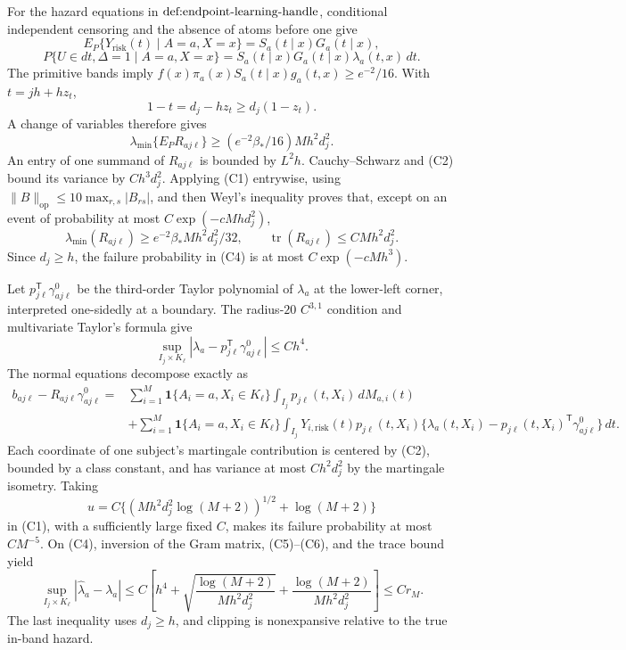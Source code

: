For the hazard equations in \(\textnormal{def:endpoint-learning-handle}\), conditional independent censoring and the absence of atoms before one give
\[
 E_P\{Y_{\mathrm{risk}}(t)\mid A=a,X=x\}=S_a(t\mid x)G_a(t\mid x),
\]
\[
 P\{U\in dt,\Delta=1\mid A=a,X=x\}
 =S_a(t\mid x)G_a(t\mid x)\lambda_a(t,x)\,dt.                         \tag{C2}
\]
The primitive bands imply \(f(x)\pi_a(x)S_a(t\mid x)g_a(t,x)\ge e^{-2}/16\).  With \(t=jh+hz_t\),
\[
 1-t=d_j-hz_t\ge d_j(1-z_t).
\]
A change of variables therefore gives
\[
 \lambda_{\min}\{E_PR_{aj\ell}\}
 \ge(e^{-2}\beta_*/16)Mh^2d_j^2.                                     \tag{C3}
\]
An entry of one summand of \(R_{aj\ell}\) is bounded by \(L^2h\).  Cauchy--Schwarz and (C2) bound its variance by \(Ch^3d_j^2\).  Applying (C1) entrywise, using \(\lVert B\rVert_{\mathrm{op}}\le10\max_{r,s}|B_{rs}|\), and then Weyl's inequality proves that, except on an event of probability at most \(C\exp(-cMhd_j^2)\),
\[
 \lambda_{\min}(R_{aj\ell})\ge e^{-2}\beta_*Mh^2d_j^2/32,
 \qquad \operatorname{tr}(R_{aj\ell})\le CMh^2d_j^2.                 \tag{C4}
\]
Since \(d_j\ge h\), the failure probability in (C4) is at most \(C\exp(-cMh^3)\).

Let \(p_{j\ell}^{\mathsf T}\gamma^0_{aj\ell}\) be the third-order Taylor polynomial of \(\lambda_a\) at the lower-left corner, interpreted one-sidedly at a boundary.  The radius-\(20\) \(C^{3,1}\) condition and multivariate Taylor's formula give
\[
 \sup_{I_j\times K_\ell}|\lambda_a-p_{j\ell}^{\mathsf T}\gamma^0_{aj\ell}|
 \le Ch^4.                                                            \tag{C5}
\]
The normal equations decompose exactly as
\[
 \begin{split}
 b_{aj\ell}-R_{aj\ell}\gamma^0_{aj\ell}
 ={}&\sum_{i=1}^M\mathbf 1\{A_i=a,X_i\in K_\ell\}
       \int_{I_j}p_{j\ell}(t,X_i)\,dM_{a,i}(t)\\
 &+\sum_{i=1}^M\mathbf 1\{A_i=a,X_i\in K_\ell\}
       \int_{I_j}Y_{i,\mathrm{risk}}(t)p_{j\ell}(t,X_i)
       \{\lambda_a(t,X_i)-p_{j\ell}(t,X_i)^{\mathsf T}\gamma^0_{aj\ell}\}\,dt.
                                                                            \tag{C6}
 \end{split}
\]
Each coordinate of one subject's martingale contribution is centered by (C2), bounded by a class constant, and has variance at most \(Ch^2d_j^2\) by the martingale isometry.  Taking
\[
 u=C\{(Mh^2d_j^2\log(M+2))^{1/2}+\log(M+2)\}
\]
in (C1), with a sufficiently large fixed \(C\), makes its failure probability at most \(CM^{-5}\).  On (C4), inversion of the Gram matrix, (C5)--(C6), and the trace bound yield
\[
 \sup_{I_j\times K_\ell}|\widehat\lambda_a-\lambda_a|
 \le C\left[h^4+\sqrt{\frac{\log(M+2)}{Mh^2d_j^2}}
 +\frac{\log(M+2)}{Mh^2d_j^2}\right]\le Cr_M.                        \tag{C7}
\]
The last inequality uses \(d_j\ge h\), and clipping is nonexpansive relative to the true in-band hazard.

